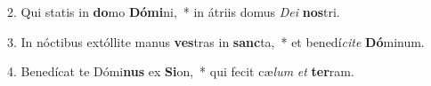 2. Qui statis in \textbf{do}mo \textbf{Dó}\textbf{mi}ni,~*  in átriis domus \textit{De}\textit{i} \textbf{nos}tri.\

3. In nóctibus extóllite manus \textbf{ves}tras in \textbf{sanc}ta,~*  et benedí\textit{ci}\textit{te} \textbf{Dó}minum.\

4. Benedícat te Dómi\textbf{nus} ex \textbf{Si}on,~*  qui fecit cæ\textit{lum} \textit{et} \textbf{ter}ram.\

